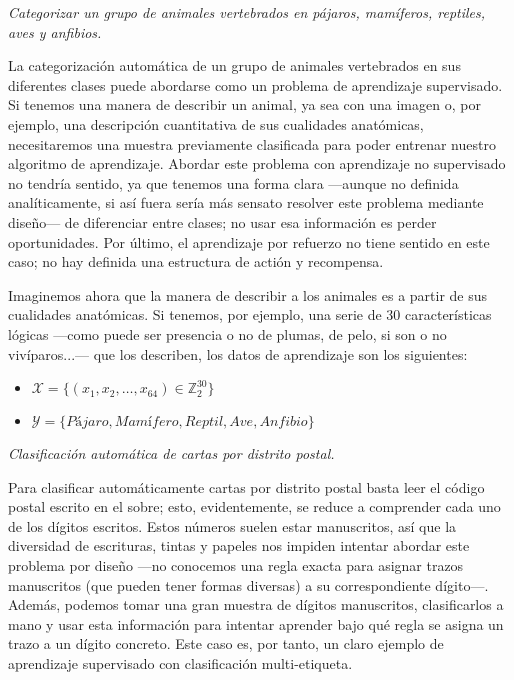 \documentclass[a4paper, 11pt]{article}
\begin{document}
    \begin{solucion}
        \emph{Categorizar un grupo de animales vertebrados en pájaros, mamíferos, reptiles, aves y anfibios.}

        La categorización automática de un grupo de animales vertebrados en sus diferentes clases puede abordarse como un problema de aprendizaje supervisado. Si tenemos una manera de describir un animal, ya sea con una imagen o, por ejemplo, una descripción cuantitativa de sus cualidades anatómicas, necesitaremos una muestra previamente clasificada para poder entrenar nuestro algoritmo de aprendizaje. Abordar este problema con aprendizaje no supervisado no tendría sentido, ya que tenemos una forma clara ---aunque no definida analíticamente, si así fuera sería más sensato resolver este problema mediante diseño--- de diferenciar entre clases; no usar esa información es perder oportunidades. Por último, el aprendizaje por refuerzo no tiene sentido en este caso; no hay definida una estructura de actión y recompensa.

        Imaginemos ahora que la manera de describir a los animales es a partir de sus cualidades anatómicas. Si tenemos, por ejemplo, una serie de 30 características lógicas ---como puede ser presencia o no de plumas, de pelo, si son o no vivíparos...--- que los describen, los datos de aprendizaje son los siguientes:
        \begin{itemize}
            \item $\mathcal{X} = \{(x_1, x_2, \dots, x_64) \in \mathbb{Z}_2^30\}$
            \item $\mathcal{Y} = \{Pájaro, Mamífero, Reptil, Ave, Anfibio\}$
        \end{itemize}

        \emph{Clasificación automática de cartas por distrito postal.}

        Para clasificar automáticamente cartas por distrito postal basta leer el código postal escrito en el sobre; esto, evidentemente, se reduce a comprender cada uno de los dígitos escritos.  Estos números suelen estar manuscritos, así que la diversidad de escrituras, tintas y papeles nos impiden intentar abordar este problema por diseño ---no conocemos una regla exacta para asignar trazos manuscritos (que pueden tener formas diversas) a su correspondiente dígito---. Además, podemos tomar una gran muestra de dígitos manuscritos, clasificarlos a mano y usar esta información para intentar aprender bajo qué regla se asigna un trazo a un dígito concreto. Este caso es, por tanto, un claro ejemplo de aprendizaje supervisado con clasificación multi-etiqueta.


\end{solucion}
\end{document}

